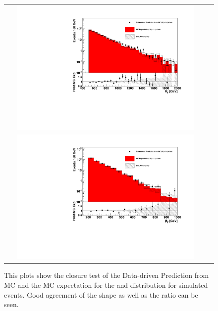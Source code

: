 \begin{figure}[tbhn]
\begin{center}
\begin{tabular}{cc}

\includegraphics[width=0.90\textwidth]{lostlepton/plots/closure/HTw.pdf}\\
\includegraphics[width=0.90\textwidth]{lostlepton/plots/closure/MHTw.pdf}
\end{tabular}
\end{center}
\caption{This plots show the closure test of the Data-driven Prediction from MC and the MC expectation for the \HT and \MHT distribution for \wpj simulated events. Good agreement of the shape as well as the ratio can be seen.}
\label{fig:closure_sepW}
\end{figure}





